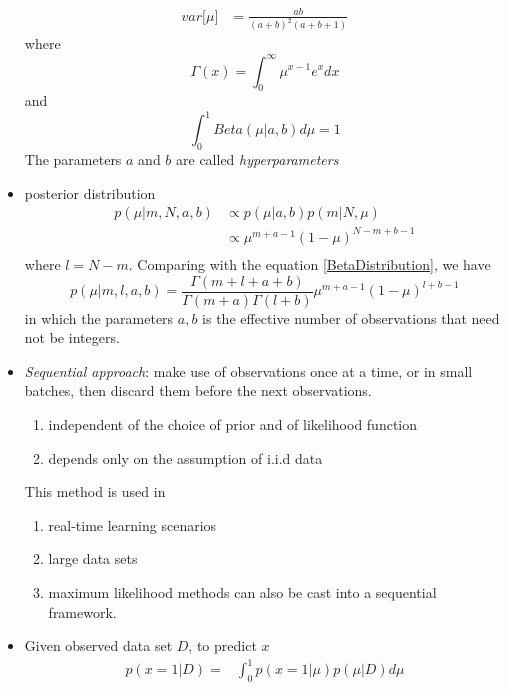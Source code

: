 \documentclass[12pt, a4paper]{article}
\begin{document}
\begin{itemize}
\begin{align}
            var\lbrack\mu\rbrack&=\frac{ab}{(a+b)^2(a+b+1)}\nonumber
        \end{align}
        where
        \begin{equation*}
            \Gamma(x)=\int_0^\infty \mu^{x-1}e^xdx
        \end{equation*}
        and
        \begin{equation*}
            \int_0^1Beta(\mu|a,b)d\mu=1
        \end{equation*}
        The parameters $a$ and $b$ are called \textit{hyperparameters}
        \item posterior distribution
        \begin{align*}
            p(\mu|m,N,a,b)&\propto p(\mu|a,b)p(m|N,\mu)\\
            &\propto \mu^{m+a-1}(1-\mu)^{N-m+b-1}\\
        \end{align*}
        where $l=N-m$. Comparing with the equation \ref{BetaDistribution}, we have
        \begin{equation*}
            p(\mu|m,l,a,b)=\frac{\Gamma(m+l+a+b)}{\Gamma(m+a)\Gamma(l+b)}
            \mu^{m+a-1}(1-\mu)^{l+b-1}
        \end{equation*}
        in which the parameters $a,b$ is the effective number of observations that
        need not be integers.
        \item \textit{Sequential approach}: make use of observations once at a time, 
        or in small batches, then discard them before the next observations.
        \begin{enumerate}
            \item independent of the choice of prior and of likelihood function
            \item depends only on the assumption of i.i.d data
        \end{enumerate}
        This method is used in
        \begin{enumerate}
            \item real-time learning scenarios
            \item large data sets
            \item maximum likelihood methods can also be cast into a sequential 
            framework.
        \end{enumerate}
        \item Given observed data set $D$, to predict $x$
        \begin{align*}
            p(x=1|D)=&\int_0^1p(x=1|\mu)p(\mu|D)d\mu\\

\end{align*}
\end{itemize}
\end{document}

